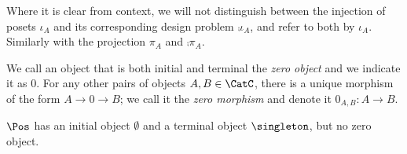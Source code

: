 \begin{remark}Where it is clear from context, we will not distinguish between the injection of posets $\iota_A$ and its corresponding design problem $\comp{\iota_A}$, and refer to both by $\iota_A$. Similarly with the projection $\pi_A$ and $\comp{\pi_A}$.
\end{remark}

\begin{table}[b]
\caption{A comparison of $\Pos, \Set$, and $\DP$.}
\end{table}

\begin{shaded}
\begin{definition}
We call an object that is both initial and terminal the \emph{zero object} and we indicate it as $0$. For any other pairs of objects  $A, B\in\CatC$, there is a unique morphism of the form $A \to 0\to B$; we call it the \emph{zero morphism} and denote it $0_{A,B}\colon A \to B$.
\end{definition}
\end{shaded}

\begin{example}
$\Pos$ has an initial object $\emptyset$ and a terminal object $\singleton$, but no zero object.\end{example}


